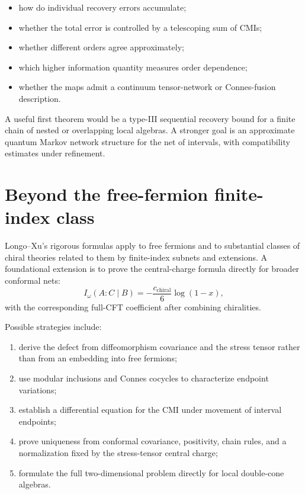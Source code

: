 \documentclass[11pt]{article}
\theoremstyle{accenttheorem}
\theoremstyle{definition}
\newcommand{\CMI}{I}
\newcommand{\1}{\mathbf{1}}
\begin{document}
\begin{itemize}
\item how do individual recovery errors accumulate;
\item whether the total error is controlled by a telescoping sum of CMIs;
\item whether different orders agree approximately;
\item which higher information quantity measures order dependence;
\item whether the maps admit a continuum tensor-network or Connes-fusion description.
\end{itemize}

A useful first theorem would be a type-III sequential recovery bound for a finite chain of nested or overlapping local algebras.  A stronger goal is an approximate quantum Markov network structure for the net of intervals, with compatibility estimates under refinement.

\section{Beyond the free-fermion finite-index class}

Longo--Xu's rigorous formulas apply to free fermions and to substantial classes of chiral theories related to them by finite-index subnets and extensions.  A foundational extension is to prove the central-charge formula directly for broader conformal nets:
\begin{equation}\label{eq:general-chiral}
 \CMI_\omega(A:C\mid B)
 =-\frac{c_{\mathrm{chiral}}}{6}\log(1-x),
\end{equation}
with the corresponding full-CFT coefficient after combining chiralities.

Possible strategies include:
\begin{enumerate}
\item derive the defect from diffeomorphism covariance and the stress tensor rather than from an embedding into free fermions;
\item use modular inclusions and Connes cocycles to characterize endpoint variations;
\item establish a differential equation for the CMI under movement of interval endpoints;
\item prove uniqueness from conformal covariance, positivity, chain rules, and a normalization fixed by the stress-tensor central charge;
\item formulate the full two-dimensional problem directly for local double-cone algebras.
\end{enumerate}
\end{document}

